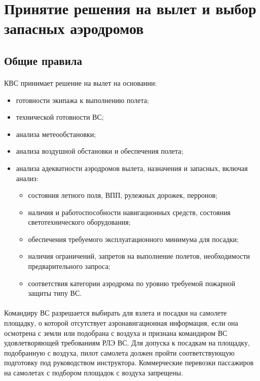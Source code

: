 \section{Принятие решения на вылет и выбор запасных аэродромов}


\subsection{Общие правила}

\paragraph{} КВС принимает решение на вылет на основании:
\begin{itemize}
    \item готовности экипажа к выполнению полета;
    \item технической готовности ВС;
    \item анализа метеообстановки;
    \item анализа воздушной обстановки и обеспечения полета;
    \item анализа адекватности аэродромов вылета, назначения и запасных, включая анализ:
    \begin{itemize}
        \item состояния летного поля, ВПП, рулежных дорожек, перронов;
        \item наличия и работоспособности навигационных средств, состояния светотехнического оборудования;
        \item обеспечения требуемого эксплуатационного минимума для посадки;
        \item наличия ограничений, запретов на выполнение полетов, необходимости предварительного запроса;
        \item соответствия категории аэродрома по уровню требуемой пожарной защиты типу ВС.
    \end{itemize}
\end{itemize}

\paragraph{} Командиру ВС разрешается выбирать для взлета и посадки на самолете площадку, о которой отсутствует аэронавигационная информация, если она осмотрена с земли или подобрана с воздуха и признана командиром ВС удовлетворяющей требованиям РЛЭ ВС. Для допуска к посадкам на площадку, подобранную с воздуха, пилот самолета должен пройти соответствующую подготовку под руководством инструктора.
Коммерческие перевозки пассажиров на самолетах с подбором площадок с воздуха запрещены.

